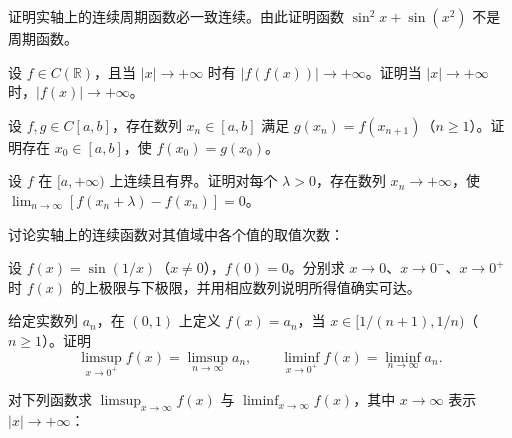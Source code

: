\noindent\begin{minipage}{\textwidth}
证明实轴上的连续周期函数必一致连续。由此证明函数 $\sin^2x+\sin(x^2)$ 不是周期函数。
\end{minipage}\par\vfill
\newpage
\noindent\begin{minipage}{\textwidth}
设 $f\in C(\mathbb R)$，且当 $|x|\to+\infty$ 时有 $|f(f(x))|\to+\infty$。证明当 $|x|\to+\infty$ 时，$|f(x)|\to+\infty$。
\end{minipage}\par\vfill
\noindent\begin{minipage}{\textwidth}
设 $f,g\in C[a,b]$，存在数列 $x_n\in[a,b]$ 满足 $g(x_n)=f(x_{n+1})$（$n\ge1$）。证明存在 $x_0\in[a,b]$，使 $f(x_0)=g(x_0)$。
\end{minipage}\par\vfill
\noindent\begin{minipage}{\textwidth}
设 $f$ 在 $[a,+\infty)$ 上连续且有界。证明对每个 $\lambda>0$，存在数列 $x_n\to+\infty$，使 $\lim_{n\to\infty}[f(x_n+\lambda)-f(x_n)]=0$。
\end{minipage}\par\vfill
\newpage
\noindent\begin{minipage}{\textwidth}
讨论实轴上的连续函数对其值域中各个值的取值次数：
\end{minipage}\par\vfill
\noindent\begin{minipage}{\textwidth}
设 $f(x)=\sin(1/x)$（$x\ne0$），$f(0)=0$。分别求 $x\to0$、$x\to0^-$、$x\to0^+$ 时 $f(x)$ 的上极限与下极限，并用相应数列说明所得值确实可达。
\end{minipage}\par\vfill
\noindent\begin{minipage}{\textwidth}
给定实数列 $a_n$，在 $(0,1)$ 上定义 $f(x)=a_n$，当 $x\in[1/(n+1),1/n)$（$n\ge1$）。证明\[\limsup_{x\to0^+}f(x)=\limsup_{n\to\infty}a_n,\qquad\liminf_{x\to0^+}f(x)=\liminf_{n\to\infty}a_n.\]
\end{minipage}\par\vfill
\newpage
\noindent\begin{minipage}{\textwidth}
对下列函数求 $\limsup_{x\to\infty}f(x)$ 与 $\liminf_{x\to\infty}f(x)$，其中 $x\to\infty$ 表示 $|x|\to+\infty$：
\end{minipage}\par\vfill
